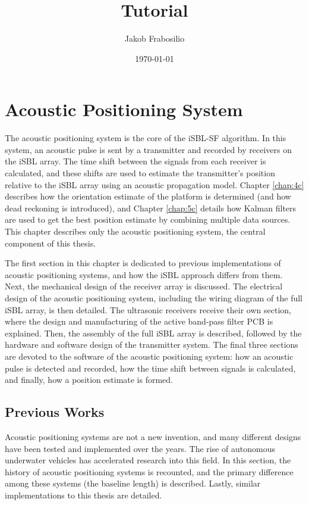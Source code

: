 \documentclass[12pt,a4paper]{report}
\title{Tutorial}
\author{Jakob Frabosilio}
\date{\today}
\begin{document}
\chapter{Acoustic Positioning System} \label{chap:3c}
The acoustic positioning system is the core of the iSBL-SF algorithm. In this system, an acoustic pulse is sent by a transmitter and recorded by receivers on the iSBL array. The time shift between the signals from each receiver is calculated, and these shifts are used to estimate the transmitter’s position relative to the iSBL array using an acoustic propagation model. Chapter \ref{chap:4c} describes how the orientation estimate of the platform is determined (and how dead reckoning is introduced), and Chapter \ref{chap:5c} details how Kalman filters are used to get the best position estimate by combining multiple data sources. This chapter describes only the acoustic positioning system, the central component of this thesis.

The first section in this chapter is dedicated to previous implementations of acoustic positioning systems, and how the iSBL approach differs from them. Next, the mechanical design of the receiver array is discussed. The electrical design of the acoustic positioning system, including the wiring diagram of the full iSBL array, is then detailed. The ultrasonic receivers receive their own section, where the design and manufacturing of the active band-pass filter PCB is explained. Then, the assembly of the full iSBL array is described, followed by the hardware and software design of the transmitter system. The final three sections are devoted to the software of the acoustic positioning system: how an acoustic pulse is detected and recorded, how the time shift between signals is calculated, and finally, how a position estimate is formed.

\section{Previous Works} \label{sec:3s1}
Acoustic positioning systems are not a new invention, and many different designs have been tested and implemented over the years. The rise of autonomous underwater vehicles has accelerated research into this field. In this section, the history of acoustic positioning systems is recounted, and the primary difference among these systems (the baseline length) is described. Lastly, similar implementations to this thesis are detailed.
\end{document}
